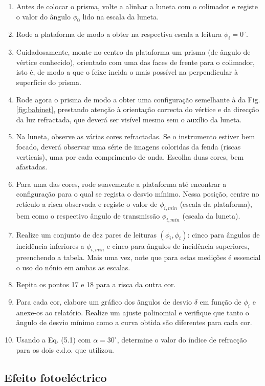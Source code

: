 \documentclass[a4paper,twoside,11pt]{report}      %
\begin{document}
\begin{enumerate}[resume]
\item Antes de colocar o prisma, volte a alinhar a luneta com o colimador e registe o valor do ângulo $\phi_0$ lido na escala da luneta.
\item Rode a plataforma de modo a obter na respectiva escala a leitura $\phi_i=0^\circ$.
\item Cuidadosamente, monte no centro da plataforma um prisma (de ângulo de vértice conhecido), orientado com uma das faces de frente para o colimador, isto é, de modo a que o feixe incida o mais possível na perpendicular à superfície do prisma.
\item Rode agora o prisma de modo a obter uma configuração semelhante à da Fig. \ref{fig:babinet}, prestando atenção à orientação correcta do vértice e da direcção da luz refractada, que deverá ser visível mesmo sem o auxílio da luneta.
\item  Na luneta, observe as várias cores refractadas.  Se o instrumento estiver bem focado, deverá  observar  uma  série  de imagens coloridas da fenda (riscas verticais), uma por cada comprimento de onda. Escolha duas cores, bem afastadas. 
\item Para uma das cores, rode suavemente a plataforma até encontrar a configuração para o qual se regista o desvio mínimo. Nessa posição, centre no retículo a risca observada e registe o valor de $\phi_{i,min}$ (escala da plataforma), bem como o respectivo ângulo de transmissão $\phi_{t,min}$ (escala da luneta).
\item Realize um conjunto de dez pares de leituras $(\phi_i,\phi_t)$: cinco para ângulos de incidência inferiores a $\phi_{i,min}$ e cinco para ângulos de incidência superiores, preenchendo a tabela. Mais uma vez, note que para estas medições é essencial o uso do nónio em ambas as escalas.
\item Repita os pontos 17 e 18 para a risca da outra cor. 
\item Para cada cor, elabore um gráfico dos ângulos de desvio $\delta$ em função de $\phi_i$ e anexe-os ao relatório. Realize um ajuste polinomial e verifique que tanto o ângulo de desvio mínimo como a curva obtida são diferentes para cada cor.
\item Usando a Eq. (5.1) com $\alpha=30^\circ$, determine o valor do índice de refracção para os dois c.d.o. que utilizou.
\end{enumerate}


\newpage
\subsection{\sf Efeito fotoeléctrico}
\end{document}
